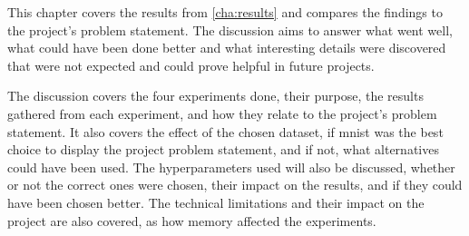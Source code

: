 This chapter covers the results from \autoref{cha:results} and compares the findings to the project's problem statement. The discussion aims to answer what went well, what could have been done better and what interesting details were discovered that were not expected and could prove helpful in future projects.

The discussion covers the four experiments done, their purpose, the results gathered from each experiment, and how they relate to the project's problem statement. 
It also covers the effect of the chosen dataset, if \gls{mnist} was the best choice to display the project problem statement, and if not, what alternatives could have been used.
The hyperparameters used will also be discussed, whether or not the correct ones were chosen, their impact on the results, and if they could have been chosen better.
The technical limitations and their impact on the project are also covered, as how memory affected the experiments.
